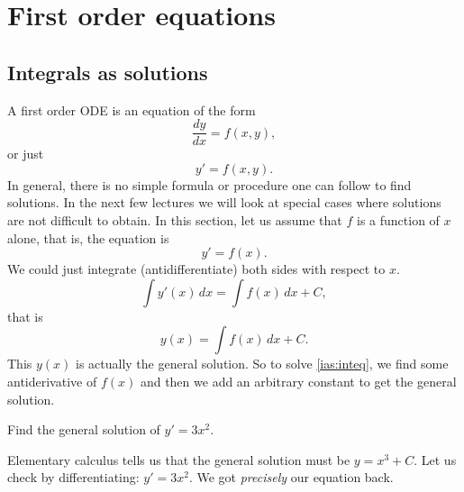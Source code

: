 \chapter{First order equations} \label{fo:chapter}


\section{Integrals as solutions}
\label{integralsols:section}


A first order ODE is an equation of the form
\begin{equation*}
\frac{dy}{dx} = f(x,y) ,
\end{equation*}
or just
\begin{equation*}
y' = f(x,y) .
\end{equation*}
In general, there is no simple formula or procedure one can follow to find
solutions.
In the next few lectures we will look at special cases where solutions are not
difficult to obtain.
In this section, let us assume that $f$ is a function of $x$ alone,
that is, the equation is
\begin{equation} \label{ias:inteq}
y' = f(x) .
\end{equation}
We could just integrate (antidifferentiate) both sides with respect to $x$.
\begin{equation*}
\int y'(x) \,dx = \int f(x) \,dx + C ,
\end{equation*}
that is
\begin{equation*}
y(x) = \int f(x) \,dx + C .
\end{equation*}
This $y(x)$ is actually the general solution.
So to solve \eqref{ias:inteq},
we find some antiderivative of $f(x)$
and then we add an arbitrary constant to get the general solution.

\begin{example}
Find the general solution of $y' = 3 x^2$.

Elementary calculus tells us
that the general solution must be $y = x^3 + C$.  Let us check by
differentiating:
$y' = 3x^2$.  We got \emph{precisely} our equation back.
\end{example}

